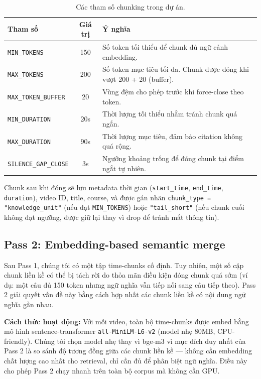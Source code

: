 \begin{table}[t]
\centering
\caption{Các tham số chunking trong dự án.}
\label{tab:chunking-params}
\small
\begin{tabular}{l c p{}}
\hline
Tham số & Giá trị & Ý nghĩa \\
\hline
\texttt{MIN\_TOKENS} & 150 & Số token tối thiểu để chunk đủ ngữ cảnh embedding. \\
\texttt{MAX\_TOKENS} & 200 & Số token mục tiêu tối đa. Chunk được đóng khi vượt 200 + 20 (buffer). \\
\texttt{MAX\_TOKEN\_BUFFER} & 20 & Vùng đệm cho phép trước khi force-close theo token. \\
\texttt{MIN\_DURATION} & 20s & Thời lượng tối thiểu nhằm tránh chunk quá ngắn. \\
\texttt{MAX\_DURATION} & 90s & Thời lượng mục tiêu, đảm bảo citation không quá rộng. \\
\texttt{SILENCE\_GAP\_CLOSE} & 3s & Ngưỡng khoảng trống để đóng chunk tại điểm ngắt tự nhiên. \\
\hline
\end{tabular}
\end{table}

Chunk sau khi đóng sẽ lưu metadata thời gian (\texttt{start\_time}, \texttt{end\_time}, \texttt{duration}), video ID, title, course, và được gán nhãn \texttt{chunk\_type = "knowledge\_unit"} (nếu đạt \texttt{MIN\_TOKENS}) hoặc \texttt{"tail\_short"} (nếu chunk cuối không đạt ngưỡng, được giữ lại thay vì drop để tránh mất thông tin).

\subsection{Pass 2: Embedding-based semantic merge}
\label{subsubsec:embedding-merge}

Sau Pass 1, chúng tôi có một tập time-chunks cố định. Tuy nhiên, một số cặp chunk liền kề có thể bị tách rời do thỏa mãn điều kiện đóng chunk quá sớm (ví dụ: một câu đủ 150 token nhưng ngữ nghĩa vẫn tiếp nối sang câu tiếp theo). Pass 2 giải quyết vấn đề này bằng cách hợp nhất các chunk liền kề có nội dung ngữ nghĩa gần nhau.

\textbf{Cách thức hoạt động:} Với mỗi video, toàn bộ time-chunks được embed bằng mô hình sentence-transformer \texttt{all-MiniLM-L6-v2} (model nhẹ 80MB, CPU-friendly). Chúng tôi chọn model nhẹ thay vì bge-m3 vì mục đích duy nhất của Pass 2 là so sánh độ tương đồng giữa các chunk liền kề — không cần embedding chất lượng cao nhất cho retrieval, chỉ cần đủ để phân biệt ngữ nghĩa. Điều này cho phép Pass 2 chạy nhanh trên toàn bộ corpus mà không cần GPU.

